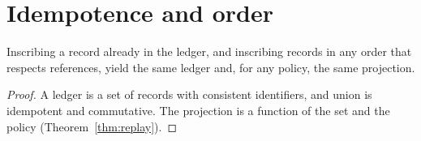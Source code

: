 \section{Idempotence and order}\label{sec:idempotence}

\begin{proposition}\label{prop:ingest}
Inscribing a record already in the ledger, and inscribing records in any order that respects references, yield the same ledger and, for any policy, the same projection.
\end{proposition}

\begin{proof}
A ledger is a set of records with consistent identifiers, and union is idempotent and commutative. The projection is a function of the set and the policy (Theorem~\ref{thm:replay}).
\end{proof}
